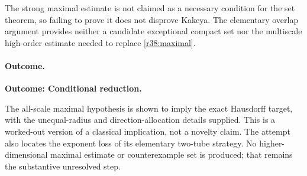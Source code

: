 \documentclass[11pt,a4paper]{article}
\numberwithin{equation}{section}
\begin{document}
The strong maximal estimate is not claimed as a necessary condition for the
set theorem, so failing to prove it does not disprove Kakeya. The elementary
overlap argument provides neither a candidate exceptional compact set nor
the multiscale high-order estimate needed to replace \eqref{r38:maximal}.

\paragraph{Outcome.}
\textbf{Outcome: Conditional reduction.}

The all-scale maximal hypothesis is shown to imply the exact Hausdorff target,
with the unequal-radius and direction-allocation details supplied. This is a
worked-out version of a classical implication, not a novelty claim. The
attempt also locates the exponent loss of its elementary two-tube strategy.
No higher-dimensional maximal estimate or counterexample set is produced;
that remains the substantive unresolved step.

\end{document}
